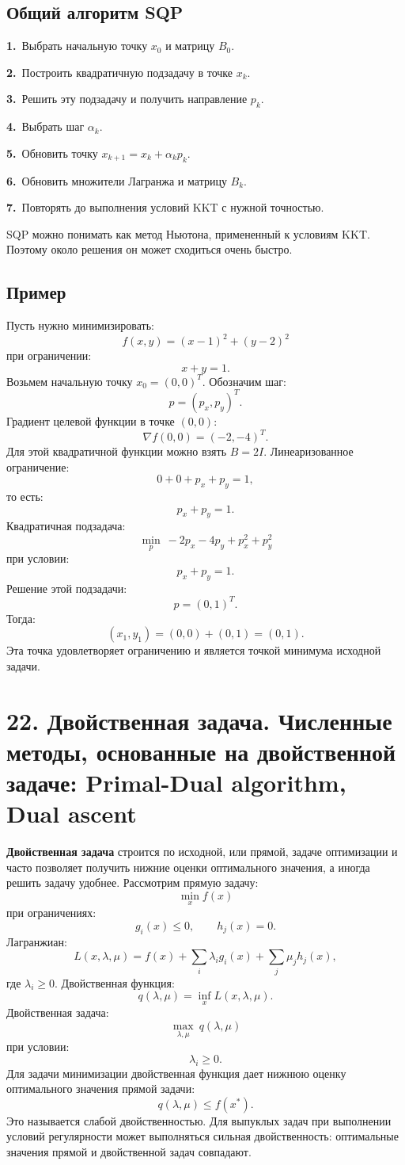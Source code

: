 \documentclass[12pt,a4paper]{article}
\begin{document}
\subsection{Общий алгоритм SQP}
\noindent\textbf{1.}\ Выбрать начальную точку $x_0$ и матрицу $B_0$.\par
\noindent\textbf{2.}\ Построить квадратичную подзадачу в точке $x_k$.\par
\noindent\textbf{3.}\ Решить эту подзадачу и получить направление $p_k$.\par
\noindent\textbf{4.}\ Выбрать шаг $\alpha_k$.\par
\noindent\textbf{5.}\ Обновить точку $x_{k+1}=x_k+\alpha_kp_k$.\par
\noindent\textbf{6.}\ Обновить множители Лагранжа и матрицу $B_k$.\par
\noindent\textbf{7.}\ Повторять до выполнения условий KKT с нужной точностью.\par
SQP можно понимать как метод Ньютона, примененный к условиям KKT. Поэтому около решения он может сходиться очень быстро.
\subsection{Пример}
Пусть нужно минимизировать:
\[
f(x,y)=(x-1)^2+(y-2)^2
\]
при ограничении:
\[
x+y=1.
\]
Возьмем начальную точку $x_0=(0,0)^T$. Обозначим шаг:
\[
p=(p_x,p_y)^T.
\]
Градиент целевой функции в точке $(0,0)$:
\[
\nabla f(0,0)=(-2,-4)^T.
\]
Для этой квадратичной функции можно взять $B=2I$. Линеаризованное ограничение:
\[
0+0+p_x+p_y=1,
\]
то есть:
\[
p_x+p_y=1.
\]
Квадратичная подзадача:
\[
\min_p\ -2p_x-4p_y+p_x^2+p_y^2
\]
при условии:
\[
p_x+p_y=1.
\]
Решение этой подзадачи:
\[
p=(0,1)^T.
\]
Тогда:
\[
(x_1,y_1)=(0,0)+(0,1)=(0,1).
\]
Эта точка удовлетворяет ограничению и является точкой минимума исходной задачи.

\section{22. Двойственная задача. Численные методы, основанные на двойственной задаче: Primal-Dual algorithm, Dual ascent}
\textbf{Двойственная задача} строится по исходной, или прямой, задаче оптимизации и часто позволяет получить нижние оценки оптимального значения, а иногда решить задачу удобнее.
Рассмотрим прямую задачу:
\[
\min_x f(x)
\]
при ограничениях:
\[
g_i(x)\le 0,\qquad h_j(x)=0.
\]
Лагранжиан:
\[
L(x,\lambda,\mu)=f(x)+\sum_i\lambda_i g_i(x)+\sum_j\mu_j h_j(x),
\]
где $\lambda_i\ge 0$.
Двойственная функция:
\[
q(\lambda,\mu)=\inf_x L(x,\lambda,\mu).
\]
Двойственная задача:
\[
\max_{\lambda,\mu}\ q(\lambda,\mu)
\]
при условии:
\[
\lambda_i\ge 0.
\]
Для задачи минимизации двойственная функция дает нижнюю оценку оптимального значения прямой задачи:
\[
q(\lambda,\mu)\le f(x^*).
\]
Это называется слабой двойственностью. Для выпуклых задач при выполнении условий регулярности может выполняться сильная двойственность: оптимальные значения прямой и двойственной задач совпадают.
\end{document}
